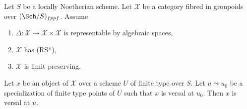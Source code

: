\begin{lemma}
\label{lemma-generalization-versality}
Let $S$ be a locally Noetherian scheme. Let $\mathcal{X}$ be a category fibred
in groupoids over $(\Sch/S)_{fppf}$. Assume
\begin{enumerate}
\item $\Delta : \mathcal{X} \to \mathcal{X} \times \mathcal{X}$ is
representable by algebraic spaces,
\item $\mathcal{X}$ has (RS*),
\item $\mathcal{X}$ is limit preserving.
\end{enumerate}
Let $x$ be an object of $\mathcal{X}$ over a scheme $U$ of finite type over
$S$. Let $u \leadsto u_0$ be a specialization of finite type points of $U$
such that $x$ is versal at $u_0$. Then $x$ is versal at $u$.
\end{lemma}

